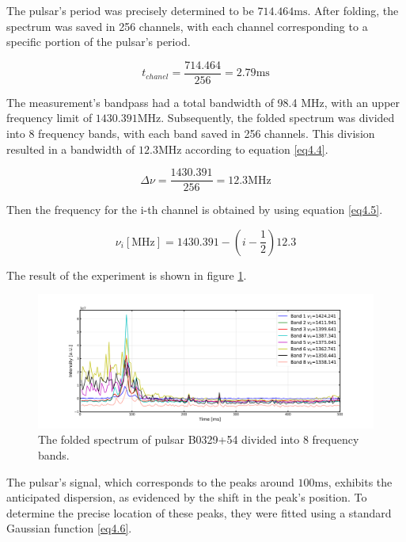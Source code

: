 \documentclass[12pt]{article}
\begin{document}
The pulsar's period was precisely determined to be $714.464\mathrm{ms}$. After folding, the spectrum was saved in 256 channels, with each channel corresponding to a specific portion of the pulsar's period.

\begin{equation}
t_{chanel} = \dfrac{714.464}{256} = 2.79 \mathrm{ms}
\label{eq4.3}
\end{equation}

The measurement's bandpass had a total bandwidth of 98.4 MHz, with an upper frequency limit of $1430.391\mathrm{MHz}$. Subsequently, the folded spectrum was divided into 8 frequency bands, with each band saved in 256 channels. This division resulted in a bandwidth of $12.3\mathrm{MHz}$ according to equation \ref{eq4.4}.

\begin{equation}
\Delta \nu = \dfrac{1430.391}{256} = 12.3 \mathrm{MHz}
\label{eq4.4}
\end{equation}

Then the frequency for the i-th channel is obtained by using equation \ref{eq4.5}. 


\begin{equation}
\nu_i \mathrm{[MHz]}= 1430.391 - (i - \dfrac{1}{2}) 12.3  
\label{eq4.5}
\end{equation}

The result of the experiment is shown in figure \ref{fig5.1}.

\begin{figure}[H]
\centering
\includegraphics[width=\textwidth]{fig/Data_frequency_bands.png}
\caption{The folded spectrum of pulsar B0329+54 divided into 8 frequency bands.}
\label{fig5.1}
\end{figure} 

The pulsar's signal, which corresponds to the peaks around $100 \mathrm{ms}$, exhibits the anticipated dispersion, as evidenced by the shift in the peak's position. To determine the precise location of these peaks, they were fitted using a standard Gaussian function \ref{eq4.6}.
\end{document}
